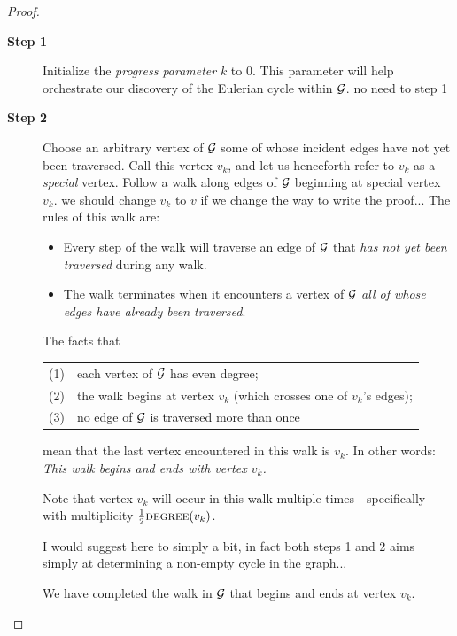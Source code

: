 \begin{proof}
\begin{description}
\item[{\bf Step 1}]
Initialize the {\it progress parameter} $k$ to $0$.  This parameter
will help orchestrate our discovery of the Eulerian cycle within $\mbox{$\cal G$}$.
{\Denis no need to step 1}

\item[{\bf Step 2}]
Choose an arbitrary vertex of $\mbox{$\cal G$}$ some of whose incident edges have not
yet been traversed.  Call this vertex $v_k$, and let us henceforth refer
to $v_k$ as a {\em special} vertex.  Follow a walk along edges of $\mbox{$\cal G$}$
beginning at special vertex $v_k$.  
{\Denis we should change $v_k$ to $v$ if we change the way to write the proof...}
The rules of this walk are:
\begin{itemize}
\item
Every step of the walk will traverse an edge of $\mbox{$\cal G$}$ that {\em has not yet been traversed} during any walk.
\item
The walk terminates when it encounters a vertex of $\mbox{$\cal G$}$ {\em all of
  whose edges have already been traversed}.
\end{itemize}
The facts that 

\hspace*{.25in}\begin{tabular}{ll}
(1) & each vertex of $\mbox{$\cal G$}$ has even degree; \\
(2) & the walk begins at vertex $v_k$ (which crosses one of $v_k$'s edges); \\
(3) & no edge of $\mbox{$\cal G$}$ is traversed more than once
\end{tabular}

\noindent
mean that the last vertex encountered in this walk is $v_k$.  In other
words: {\em This walk begins and ends with vertex $v_k$.}

{\Arny
\noindent {}

\noindent {}
}


Note that vertex $v_k$ will occur in this walk multiple
times---specifically with multiplicity $\frac{1}{2} \mbox{\sc
  degree}(v_k)$.
  
{\Denis I would suggest here to simply a bit, in fact both  steps 1 and 2 aims simply at determining a non-empty cycle in the graph...}

We have completed the walk in $\mbox{$\cal G$}$ that begins and ends at vertex $v_k$.


\end{description}
\end{proof}
